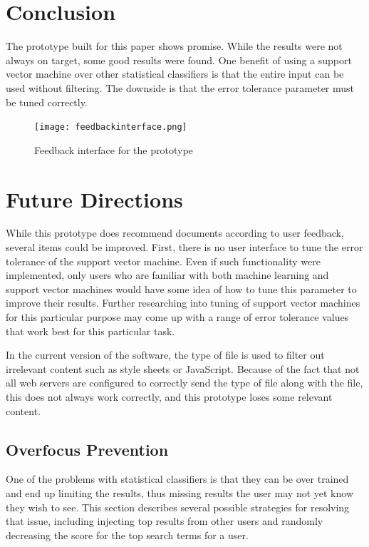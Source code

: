 \documentclass[12pt]{article}
\begin{document}
\section{Conclusion}
The prototype built for this paper shows promise. While the results were not always on target, some good
results were found. One benefit of using a support vector machine over other statistical classifiers is that
the entire input can be used without filtering. The downside is that the error tolerance parameter must be
tuned correctly.
\begin{figure}[center]
  \centering
  \texttt{[image: feedbackinterface.png]}
  \caption{Feedback interface for the prototype}
\end{figure}
\section{Future Directions}
While this prototype does recommend documents according to user feedback, several items could be
improved. First, there is no user interface to tune the error tolerance of the support vector machine. Even if
such functionality were implemented, only users who are familiar with both machine learning and support vector
machines would have some idea of how to tune this parameter to improve their results. Further researching into
tuning of support vector machines for this particular purpose may come up with a range of error tolerance
values that work best for this particular task.

In the current version of the software, the type of file is used to filter out irrelevant content such as
style sheets or JavaScript. Because of the fact that not all web servers are configured to correctly send the
type of file along with the file, this does not always work correctly, and this prototype loses some relevant
content.
\subsection{Overfocus Prevention}
One of the problems with statistical classifiers is that they can be over trained and end up limiting the
results, thus missing results the user may not yet know they wish to see.  This section describes several
possible strategies for resolving that issue, including injecting top results from other users and randomly
decreasing the score for the top search terms for a user.
\end{document}
